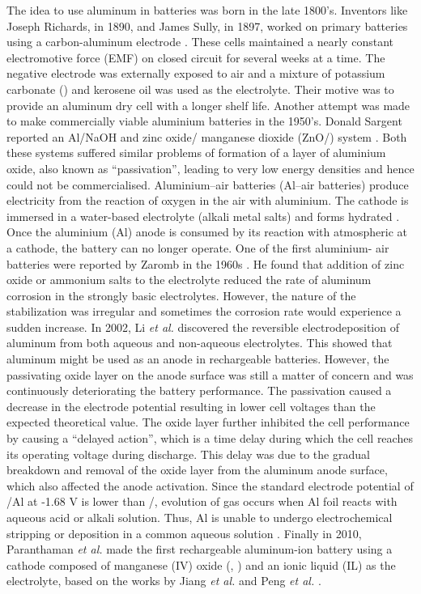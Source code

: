 The idea to use aluminum in batteries was born in the late 1800's. Inventors like Joseph Richards, in 1890, and James Sully, in 1897, worked on primary batteries using a carbon-aluminum electrode \cite{noauthor_james_1897,richards_aluminium_1890}. These cells maintained a nearly constant electromotive force (EMF) on closed circuit for several weeks at a time. The negative electrode was externally exposed to air and a mixture of potassium carbonate () and kerosene oil was used as the electrolyte. Their motive was to provide an aluminum dry cell with a longer shelf life. Another attempt was made to make commercially viable aluminium batteries in the 1950's. Donald Sargent reported an Al/NaOH and zinc oxide/ manganese dioxide (ZnO/) system . Both these systems suffered similar problems of formation of a layer of aluminium oxide, also known as \enquote{passivation}, leading to very low energy densities and hence could not be commercialised. Aluminium–air batteries (Al–air batteries) produce electricity from the reaction of oxygen in the air with aluminium. The cathode is immersed in a water-based electrolyte (alkali metal salts) and forms hydrated . Once the aluminium (Al) anode is consumed by its reaction with atmospheric  at a cathode, the battery can no longer operate. One of the first aluminium- air batteries were reported by Zaromb in the 1960s \cite{zaromb_use_1962}. He found that addition of zinc oxide or ammonium salts to the electrolyte reduced the rate of aluminum corrosion in the strongly basic electrolytes. However, the nature of the stabilization was irregular and sometimes the corrosion rate would experience a sudden increase\cite{bockstie_control_1963}. In 2002, Li \textit{et al.} discovered the reversible electrodeposition of aluminum from both aqueous and non-aqueous electrolytes\cite{li_aluminum_2002}. This showed that aluminum might be used as an anode in rechargeable batteries. However, the passivating oxide layer on the anode surface was still a matter of concern and was continuously deteriorating the battery performance. The passivation caused a decrease in the electrode potential resulting in lower cell voltages than the expected theoretical value. The oxide layer further inhibited the cell performance by causing a \enquote{delayed action}, which is a time delay during which the cell reaches its operating voltage during discharge. This delay was due to the gradual breakdown and removal of the oxide layer from the aluminum anode surface, which also affected the anode activation. Since the standard electrode potential of /Al at -1.68 V is lower than /, evolution of  gas occurs when Al foil reacts with aqueous acid or alkali solution. Thus, Al is unable to undergo electrochemical stripping or deposition in a common aqueous solution \cite{wu_electrochemically_2019}. Finally in 2010, Paranthaman \textit{et al.} made the first rechargeable aluminum-ion battery using a cathode composed of manganese (IV) oxide (, ) and an ionic liquid (IL) as the electrolyte, based on the works by Jiang \textit{et al.} and Peng \textit{et al.} \cite{paranthaman_transformational_2010, jiang_electrodeposition_2006,peng_investigation_2008}. 
